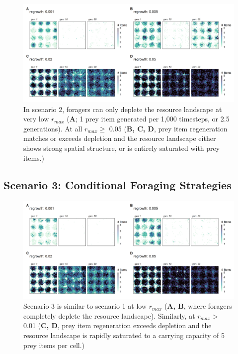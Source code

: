 \documentclass[11pt]{article}
\begin{document}
\begin{figure}[h!]
        \centering
        \includegraphics*[width=1.0\textwidth]{figures/fig_landscape_rmax_obligate.png}
        \caption{In scenario 2, foragers can only deplete the resource landscape at very low $r_{max}$ (\textbf{A}; 1 prey item generated per 1,000 timesteps, or 2.5 generations).
        At all $r_{max} \geq$ 0.05 (\textbf{B, C, D}, prey item regeneration matches or exceeds depletion and the resource landscape either shows strong spatial structure, or is entirely saturated with prey items.)}
\end{figure}

\newpage

\subsection{Scenario 3: Conditional Foraging Strategies}

\begin{figure}[h!]
        \centering
        \includegraphics*[width=1.0\textwidth]{figures/fig_landscape_rmax_facultative.png}
        \caption{Scenario 3 is similar to scenario 1 at low $r_{max}$ (\textbf{A, B}, where foragers completely deplete the resource landscape).
        Similarly, at $r_{max} >$ 0.01 (\textbf{C, D}, prey item regeneration exceeds depletion and the resource landscape is rapidly saturated to a carrying capacity of 5 prey items per cell.)}
\end{figure}
\end{document}
